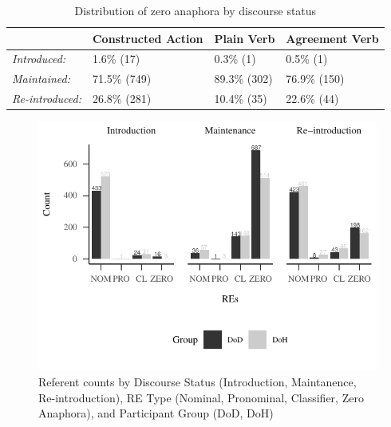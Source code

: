 \documentclass[]{elsarticle} %
\begin{document}
\begin{table}
\small
\caption{Distribution of zero anaphora by discourse status}
\label{tab:my-table5}
\begin{tabular}{llll}
\hline
                        & Constructed Action & Plain Verb    & Agreement Verb \\ \hline
\textit{Introduced:}    & 1.6\% (17)        & 0.3\% (1)    & 0.5\% (1)      \\
\textit{Maintained:}    & 71.5\% (749)      & 89.3\% (302) & 76.9\% (150)  \\
\textit{Re-introduced:} & 26.8\% (281)      & 10.4\% (35)   & 22.6\% (44)   \\ \hline
\end{tabular}
\end{table}

\begin{figure}
\centering
\includegraphics{revised_manuscript_files/figure-latex/fig:count-plot-1.pdf}
\caption{Referent counts by Discourse Status (Introduction, Maintanence,
Re-introduction), RE Type (Nominal, Pronominal, Classifier, Zero
Anaphora), and Participant Group (DoD, DoH)}
\end{figure}
\end{document}
